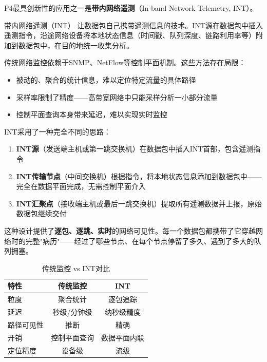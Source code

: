 P4最具创新性的应用之一是\textbf{带内网络遥测}（In-band Network Telemetry, INT）。

\begin{definition}{带内网络遥测（INT）}
让数据包自己携带遥测信息的技术。INT源在数据包中插入遥测指令，沿途网络设备将本地状态信息（时间戳、队列深度、链路利用率等）附加到数据包中，在目的地统一收集分析。
\end{definition}

传统网络监控依赖于SNMP、NetFlow等控制平面机制。这些方法存在局限：
\begin{itemize}
    \item 被动的、聚合的统计信息，难以定位特定流量的具体路径
    \item 采样率限制了精度——高带宽网络中只能采样分析一小部分流量
    \item 控制平面查询本身带来延迟，难以实现实时监控
\end{itemize}

INT采用了一种完全不同的思路：

\begin{enumerate}
    \item \textbf{INT源}（发送端主机或第一跳交换机）在数据包中插入INT首部，包含遥测指令
    \item \textbf{INT传输节点}（中间交换机）根据指令，将本地状态信息添加到数据包中——完全在数据平面完成，无需控制平面介入
    \item \textbf{INT汇聚点}（接收端主机或最后一跳交换机）提取所有遥测数据并上报，原始数据包继续交付
\end{enumerate}

这种设计提供了\textbf{逐包、逐跳、实时}的网络可见性。每一个数据包都携带了它穿越网络时的完整"病历"——经过了哪些节点、在每个节点停留了多久、遇到了多大的队列拥塞。

\begin{table}[h]
\centering
\caption{传统监控 vs INT对比}
\begin{tabular}{lcc}
\toprule
\textbf{特性} & \textbf{传统监控} & \textbf{INT} \\
\midrule
粒度 & 聚合统计 & 逐包追踪 \\
延迟 & 秒级/分钟级 & 纳秒级精度 \\
路径可见性 & 推断 & 精确 \\
开销 & 控制平面查询 & 数据平面内联 \\
定位精度 & 设备级 & 流级 \\
\bottomrule
\end{tabular}
\end{table}

